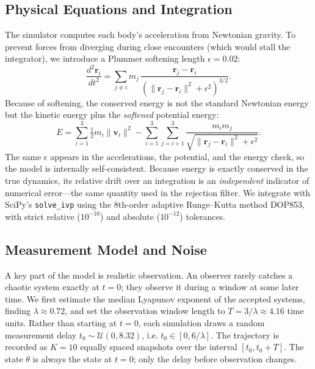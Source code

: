 \documentclass[12pt]{article}
\begin{document}
\subsection{Physical Equations and Integration}
The simulator computes each body's acceleration from Newtonian gravity. To prevent forces
from diverging during close encounters (which would stall the integrator), we introduce a
Plummer softening length $\epsilon = 0.02$:
\begin{equation}
    \frac{d^2 \mathbf{r}_i}{dt^2} = \sum_{j \neq i} m_j \,
    \frac{\mathbf{r}_j - \mathbf{r}_i}{\left(\lVert \mathbf{r}_j - \mathbf{r}_i \rVert^2 + \epsilon^2\right)^{3/2}}.
\end{equation}
Because of softening, the conserved energy is not the standard Newtonian energy but the
kinetic energy plus the \emph{softened} potential energy:
\begin{equation}
    E = \sum_{i=1}^{3} \tfrac{1}{2} m_i \lVert \mathbf{v}_i \rVert^2
    - \sum_{i=1}^{3}\sum_{j=i+1}^{3}
    \frac{m_i m_j}{\sqrt{\lVert \mathbf{r}_j - \mathbf{r}_i \rVert^2 + \epsilon^2}}.
\end{equation}
The same $\epsilon$ appears in the accelerations, the potential, and the energy check, so
the model is internally self-consistent. Because energy is exactly conserved in the true
dynamics, its relative drift over an integration is an \emph{independent} indicator of
numerical error---the same quantity used in the rejection filter. We integrate with SciPy's
\texttt{solve\_ivp} using the 8th-order adaptive Runge--Kutta method DOP853, with strict
relative ($10^{-10}$) and absolute ($10^{-12}$) tolerances.
 
\subsection{Measurement Model and Noise}
A key part of the model is realistic observation. An observer rarely catches a chaotic
system exactly at $t=0$; they observe it during a window at some later time. We first
estimate the median Lyapunov exponent of the accepted systems, finding $\lambda \approx 0.72$,
and set the observation window length to $T = 3/\lambda \approx 4.16$ time units. Rather than
starting at $t=0$, each simulation draws a random measurement delay
$t_0 \sim \mathcal{U}(0, 8.32)$, i.e. $t_0 \in [0, 6/\lambda]$. The trajectory is recorded as
$K=10$ equally spaced snapshots over the interval $[t_0, t_0+T]$. The state $\theta$ is
always the state at $t=0$; only the delay before observation changes.
 
\end{document}
